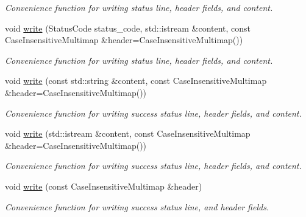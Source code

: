 \begin{DoxyCompactItemize}
\begin{DoxyCompactList}\small\item\em Convenience function for writing status line, header fields, and content. \end{DoxyCompactList}\item 
void \hyperlink{classSimpleWeb_1_1ServerBase_1_1Response_ab55da7f0f55399c976a96bcb696ac143}{write} (Status\+Code status\+\_\+code, std\+::istream \&content, const Case\+Insensitive\+Multimap \&header=Case\+Insensitive\+Multimap())\hypertarget{classSimpleWeb_1_1ServerBase_1_1Response_ab55da7f0f55399c976a96bcb696ac143}{}\label{classSimpleWeb_1_1ServerBase_1_1Response_ab55da7f0f55399c976a96bcb696ac143}

\begin{DoxyCompactList}\small\item\em Convenience function for writing status line, header fields, and content. \end{DoxyCompactList}\item 
void \hyperlink{classSimpleWeb_1_1ServerBase_1_1Response_a95d7e63f84fe03b2026836a3e37721bf}{write} (const std\+::string \&content, const Case\+Insensitive\+Multimap \&header=Case\+Insensitive\+Multimap())\hypertarget{classSimpleWeb_1_1ServerBase_1_1Response_a95d7e63f84fe03b2026836a3e37721bf}{}\label{classSimpleWeb_1_1ServerBase_1_1Response_a95d7e63f84fe03b2026836a3e37721bf}

\begin{DoxyCompactList}\small\item\em Convenience function for writing success status line, header fields, and content. \end{DoxyCompactList}\item 
void \hyperlink{classSimpleWeb_1_1ServerBase_1_1Response_a044ab0ea2f5eb3ed3c7491267fced720}{write} (std\+::istream \&content, const Case\+Insensitive\+Multimap \&header=Case\+Insensitive\+Multimap())\hypertarget{classSimpleWeb_1_1ServerBase_1_1Response_a044ab0ea2f5eb3ed3c7491267fced720}{}\label{classSimpleWeb_1_1ServerBase_1_1Response_a044ab0ea2f5eb3ed3c7491267fced720}

\begin{DoxyCompactList}\small\item\em Convenience function for writing success status line, header fields, and content. \end{DoxyCompactList}\item 
void \hyperlink{classSimpleWeb_1_1ServerBase_1_1Response_ab22168a8b35507acfccb57bd6b95bcd5}{write} (const Case\+Insensitive\+Multimap \&header)\hypertarget{classSimpleWeb_1_1ServerBase_1_1Response_ab22168a8b35507acfccb57bd6b95bcd5}{}\label{classSimpleWeb_1_1ServerBase_1_1Response_ab22168a8b35507acfccb57bd6b95bcd5}

\begin{DoxyCompactList}\small\item\em Convenience function for writing success status line, and header fields. \end{DoxyCompactList}\end{DoxyCompactItemize}
